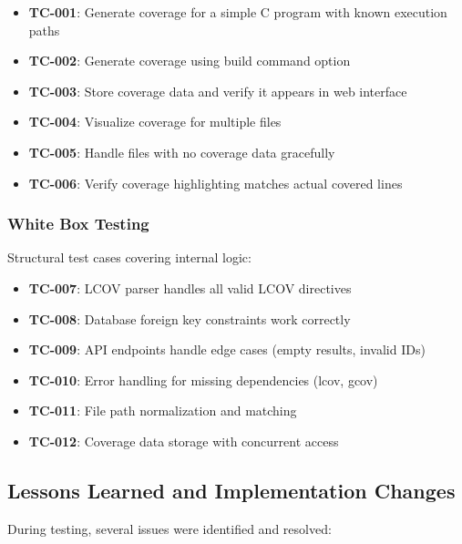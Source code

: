 \begin{itemize}
    \item \textbf{TC-001}: Generate coverage for a simple C program with known execution paths
    \item \textbf{TC-002}: Generate coverage using build command option
    \item \textbf{TC-003}: Store coverage data and verify it appears in web interface
    \item \textbf{TC-004}: Visualize coverage for multiple files
    \item \textbf{TC-005}: Handle files with no coverage data gracefully
    \item \textbf{TC-006}: Verify coverage highlighting matches actual covered lines
\end{itemize}

\subsubsection{White Box Testing}

Structural test cases covering internal logic:

\begin{itemize}
    \item \textbf{TC-007}: LCOV parser handles all valid LCOV directives
    \item \textbf{TC-008}: Database foreign key constraints work correctly
    \item \textbf{TC-009}: API endpoints handle edge cases (empty results, invalid IDs)
    \item \textbf{TC-010}: Error handling for missing dependencies (lcov, gcov)
    \item \textbf{TC-011}: File path normalization and matching
    \item \textbf{TC-012}: Coverage data storage with concurrent access
\end{itemize}

\subsection{Lessons Learned and Implementation Changes}

During testing, several issues were identified and resolved:

